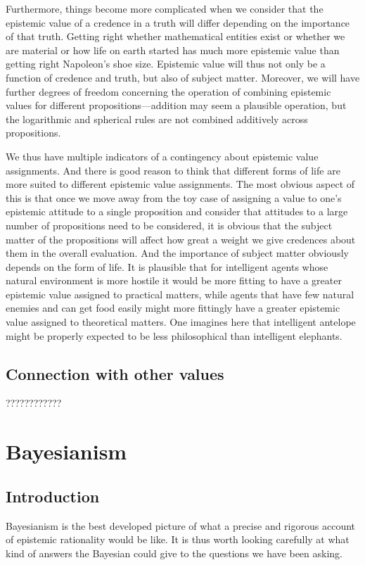 Furthermore, things become more complicated when we consider that the epistemic value of a credence in a truth will
differ depending on the importance of that truth. Getting right whether mathematical entities exist or whether we are 
material or how life on earth started has much more epistemic value than getting right Napoleon's shoe size. Epistemic
value will thus not only be a function of credence and truth, but also of subject matter. Moreover, we will have 
further degrees of freedom concerning the operation of combining epistemic values for different propositions---addition
may seem a plausible operation, but the logarithmic and spherical rules are not combined additively across propositions.

We thus have multiple indicators of a contingency about epistemic value assignments. And there is good reason to think
that different forms of life are more suited to different epistemic value assignments. The most obvious aspect of this
is that once we move away from the toy case of assigning a value to one's epistemic attitude to a single proposition
and consider that attitudes to a large number of propositions need to be considered, it is obvious that the subject
matter of the propositions will affect how great a weight we give credences about them in the overall evaluation. And
the importance of subject matter obviously depends on the form of life. It is plausible that for intelligent agents whose
natural environment is more hostile it would be more fitting to have a greater epistemic 
value assigned to practical matters, while agents that have few natural enemies and can get food easily might more fittingly
have a greater epistemic value assigned to theoretical matters. One imagines here that intelligent antelope might be
properly expected to be less philosophical than intelligent elephants.

\subsection{Connection with other values}
????????????

\section{Bayesianism}
\subsection{Introduction}
Bayesianism is the best developed picture of what a precise and rigorous account of epistemic rationality would be like.
It is thus worth looking carefully at what kind of answers the Bayesian could give to the questions we have been asking.

